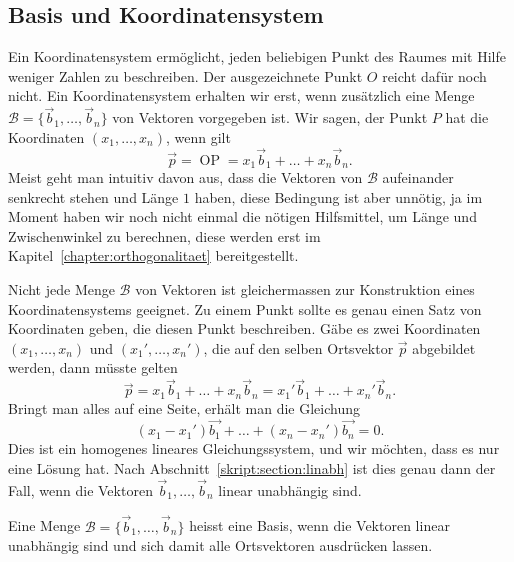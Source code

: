 %
%
\subsection{Basis und Koordinatensystem}
Ein Koordinatensystem ermöglicht, jeden beliebigen Punkt des Raumes mit
Hilfe weniger Zahlen zu beschreiben.
Der ausgezeichnete Punkt $O$ reicht dafür noch nicht. 
Ein Koordinatensystem erhalten wir erst, wenn zusätzlich eine Menge
$\mathcal{B}=\{\vec{b}_1,\dots,\vec{b}_n\}$ von Vektoren vorgegeben ist.
Wir sagen, der Punkt $P$ hat die Koordinaten $(x_1,\dots,x_n)$, wenn 
gilt
\[
\vec{p}=\operatorname{OP} = x_1\vec{b}_1+\dots+x_n\vec{b}_n.
\]
Meist geht man intuitiv davon aus, dass die Vektoren von $\mathcal{B}$
aufeinander senkrecht stehen und Länge $1$ haben, diese Bedingung
ist aber unnötig, ja im Moment haben wir noch nicht einmal die
nötigen Hilfsmittel, um Länge und Zwischenwinkel zu berechnen, diese
werden erst im Kapitel~\ref{chapter:orthogonalitaet} bereitgestellt.

Nicht jede Menge $\mathcal{B}$ von Vektoren ist gleichermassen
zur Konstruktion eines Koordinatensystems geeignet.
Zu einem Punkt sollte es genau einen Satz von Koordinaten geben,
die diesen Punkt beschreiben.
Gäbe es zwei Koordinaten $(x_1,\dots,x_n)$ und $(x_1',\dots,x_n')$,
die auf den selben Ortsvektor $\vec{p}$ abgebildet werden, dann müsste gelten
\[
\vec{p}=
x_1\vec{b}_1+\dots+x_n\vec{b}_n
=
x_1'\vec{b}_1+\dots+x_n'\vec{b}_n.
\]
Bringt man alles auf eine Seite, erhält man die Gleichung
\[
(x_1-x_1')\vec{b_1}
+\dots+
(x_n-x_n')\vec{b_n}
=0.
\]
Dies ist ein homogenes lineares Gleichungssystem, und wir möchten, dass
es nur eine Lösung hat.
Nach Abschnitt~\ref{skript:section:linabh} ist dies genau dann der Fall,
wenn die Vektoren $\vec{b}_1,\dots,\vec{b}_n$ linear unabhängig sind.

\begin{definition}
Eine Menge $\mathcal{B}=\{\vec{b}_1,\dots,\vec{b}_n\}$ heisst eine Basis,
wenn die Vektoren linear unabhängig sind und sich damit alle Ortsvektoren
ausdrücken lassen.
\end{definition}

